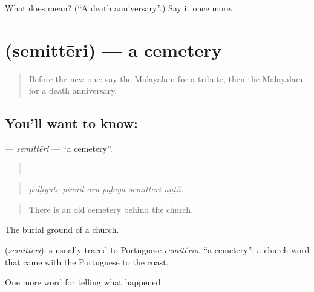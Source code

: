 \begin{tcolorbox}[breakable,colback=teal!4,colframe=teal!35!black,title={Before you move on}]
What does  mean? (\textquotedblleft{}A death anniversary\textquotedblright{}.) Say it once more.
\end{tcolorbox}
\section[\texorpdfstring{\ml{സെമിത്തേരി} (semittēri)}{സെമിത്തേരി (semittēri)}]{ (semittēri) — a cemetery}

\label{lesson:ML-C392-semitteri}



\begin{quote}
Before the new one: say the Malayalam for a tribute, then the Malayalam for a death anniversary.
\end{quote}

\subsection*{You'll want to know: }
\textbf{} — \emph{semittēri} — \textquotedblleft{}a cemetery\textquotedblright{}.

\begin{quote}
     .
\end{quote}

\begin{quote}
\emph{paḷḷiyuṭe pinnil oru paḻaya semittēri uṇṭŭ.}
\end{quote}

\begin{quote}
There is an old cemetery behind the church.
\end{quote}

The burial ground of a church.

\begin{cousinweb}
\textbf{} (\emph{semittēri}) is usually traced to Portuguese \emph{cemitério}, \textquotedblleft{}a cemetery\textquotedblright{}: a church word that came with the Portuguese to the coast.
\end{cousinweb}

\begin{grammarlens}[title={What you've built}]
One more word for telling what happened.
\end{grammarlens}

